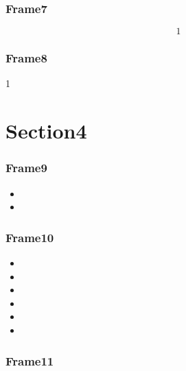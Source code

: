 \documentclass[xcolor={usenames,dvipsnames}, 
	hyperref={
	colorlinks=false, 						%
	linkcolor=black, 						%
	urlcolor=black,							%
	citecolor=black,						%
	pdfpagelabels=false,
	},
	ignorenonframetext,			%
	compress,					%
	aspectratio=169
]{beamer}
\begin{document}
\begin{frame}
	\frametitle{Frame7}
	
	\begin{equation*}
		1
	\end{equation*}

\end{frame}

\begin{frame}
	\frametitle{Frame8}
	
	
	\begin{block}{}
	1
	\end{block}
	
\end{frame}

\section{Section4}
\begin{frame}
\frametitle{Frame9}


\begin{itemize}
\item
\item 
\end{itemize}

\end{frame}


\begin{frame}
\frametitle{Frame10}
\begin{itemize}
	\item 
	\item
	\item 
	\item
	\item 
	\item 
\end{itemize}
\end{frame}

\begin{frame}
\frametitle{Frame11}

\end{frame}






\end{document}
